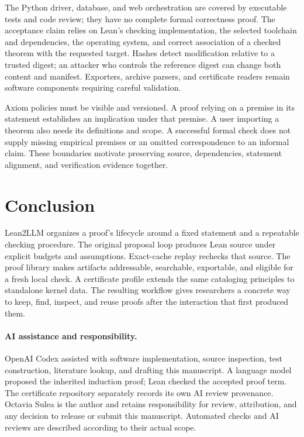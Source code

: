 \documentclass[10pt,a4paper]{article}
\begin{document}
The Python driver, database, and web orchestration are covered by executable
tests and code review; they have no complete formal correctness proof. The
acceptance claim relies on Lean's checking implementation, the selected
toolchain and dependencies, the operating system, and correct association of a
checked theorem with the requested target. Hashes detect modification relative
to a trusted digest; an attacker who controls the reference digest can change
both content and manifest. Exporters, archive parsers, and certificate readers
remain software components requiring careful validation.

Axiom policies must be visible and versioned. A proof relying on a premise in
its statement establishes an implication under that premise. A user importing
a theorem also needs its definitions and scope. A successful formal check
does not supply missing empirical premises or an omitted correspondence to an
informal claim. These boundaries motivate preserving source, dependencies,
statement alignment, and verification evidence together.

\section{Conclusion}
Lean2LLM organizes a proof's lifecycle around a fixed statement and a repeatable
checking procedure. The original proposal loop produces Lean source under
explicit budgets and assumptions. Exact-cache replay rechecks that source.
The proof library makes artifacts addressable, searchable, exportable, and
eligible for a fresh local check. A certificate profile extends the same
cataloging principles to standalone kernel data. The resulting workflow gives
researchers a concrete way to keep, find, inspect, and reuse proofs after the
interaction that first produced them.

\paragraph{AI assistance and responsibility.}
OpenAI Codex assisted with software implementation, source inspection, test
construction, literature lookup, and drafting this manuscript. A language model
proposed the inherited induction proof; Lean checked the accepted proof term.
The certificate repository separately records its own AI review provenance.
Octavia Sulea is the author and retains responsibility for review, attribution,
and any decision to release or submit this manuscript. Automated checks and AI
reviews are described according to their actual scope.
\end{document}

